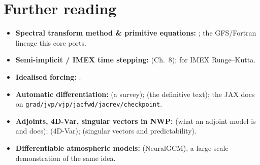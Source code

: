 \documentclass[11pt]{article}
\newcommand{\code}[1]{\texttt{#1}}
\begin{document}
\section*{Further reading}
\begin{itemize}
\item \textbf{Spectral transform method \& primitive equations:} \citet{durran2010};
  the GFS/Fortran lineage this core ports.
\item \textbf{Semi-implicit / IMEX time stepping:} \citet{durran2010} (Ch.~8);
  \citet{ascher1997} for IMEX Runge--Kutta.
\item \textbf{Idealised forcing:} \citet{heldsuarez1994}.
\item \textbf{Automatic differentiation:} \citet{baydin2018} (a survey);
  \citet{griewank2008} (the definitive text); the JAX docs on
  \code{grad/jvp/vjp/jacfwd/jacrev/checkpoint}.
\item \textbf{Adjoints, 4D-Var, singular vectors in NWP:} \citet{errico1997}
  (what an adjoint model is and does); \citet{kalnay2003} (4D-Var);
  \citet{palmer1998} (singular vectors and predictability).
\item \textbf{Differentiable atmospheric models:} \citet{kochkov2024} (NeuralGCM),
  a large-scale demonstration of the same idea.
\end{itemize}
\end{document}
